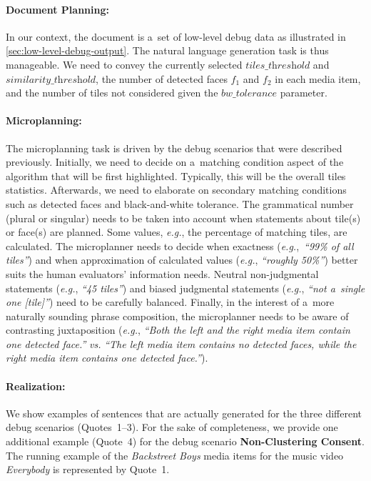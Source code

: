 \paragraph{Document Planning:}

In our context, the document is a~set of low-level debug data
as illustrated in \autoref{sec:low-level-debug-output}.
The natural language generation task is thus manageable.
We need to convey the currently selected $\textit{tiles\_threshold}$
and $\textit{similarity\_threshold}$, the number of detected faces
$f_1$ and $f_2$ in each media item, and the number of tiles
not considered given the $\textit{bw\_tolerance}$ parameter.

\paragraph{Microplanning:}

The microplanning task is driven by the debug scenarios
that were described previously.
Initially, we need to decide on a~matching condition aspect
of the algorithm that will be first highlighted.
Typically, this will be the overall tiles statistics.
Afterwards, we need to elaborate on secondary matching conditions
such as detected faces and black-and-white tolerance.
The grammatical number (plural or singular)
needs to be taken into account when statements about tile(s) or face(s)
are planned. Some values, \emph{e.g.},
the percentage of matching tiles, are calculated.
The microplanner needs to decide when exactness
(\emph{e.g.},~\textit{``99\% of all tiles''})
and when approximation of calculated values
(\emph{e.g.}, \textit{``roughly 50\%''}) better suits
the human evaluators' information needs. Neutral non-judgmental statements
(\emph{e.g.}, \textit{``45 tiles''}) and biased judgmental statements
(\emph{e.g.}, \textit{``not a~single one [tile]''})
need to be carefully balanced. Finally, in the interest of
a~more naturally sounding phrase composition,
the microplanner needs to be aware of contrasting juxtaposition
(\emph{e.g.}, \textit{``Both the left and the right media item
contain one detected face.''} \emph{vs.}
\textit{``The left media item contains no detected faces,
while the right media item contains one detected face.''}).

\paragraph{Realization:}

We show examples of sentences that are actually generated
for the three different debug scenarios (Quotes~1--3).
For the sake of completeness, we provide one additional example
(Quote~4) for the debug scenario \textbf{Non-Clustering Consent}.
The running example of the \emph{Backstreet Boys} media items
for the music video \emph{Everybody} is represented by Quote~1.

